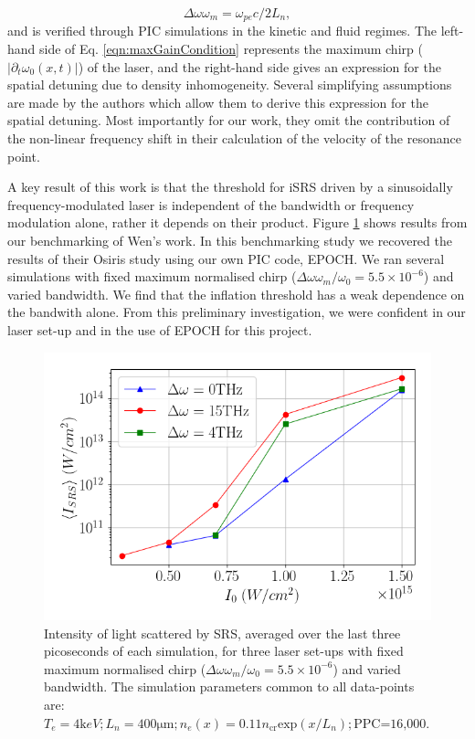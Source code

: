\begin{equation}\label{eqn:maxGainCondition}
 \Delta\omega\omega_m = \omega_{pe}c / 2L_n,
\end{equation} and is verified through PIC simulations in the kinetic and fluid regimes. The left-hand side of Eq. \ref{eqn:maxGainCondition} represents the maximum chirp ($|\partial_t\omega_0(x,t)|$) of the laser, and the right-hand side gives an expression for the spatial detuning due to density inhomogeneity. Several simplifying assumptions are made by the authors which allow them to derive this expression for the spatial detuning. Most importantly for our work, they omit the contribution of the non-linear frequency shift in their calculation of the velocity of the resonance point. 

A key result of this work is that the threshold for iSRS driven by a sinusoidally frequency-modulated laser is independent of the bandwidth or frequency modulation alone, rather it depends on their product. Figure \ref{fig:Wenreplication} shows results from our benchmarking of Wen's work. In this benchmarking study we recovered the results of their Osiris study using our own PIC code, EPOCH. We ran several simulations with fixed maximum normalised chirp ($\Delta\omega \omega_m / \omega_0=5.5\times10^{-6}$) and varied bandwidth. We find that the inflation threshold has a weak dependence on the bandwith alone. From this preliminary investigation, we were confident in our laser set-up and in the use of EPOCH for this project.


\begin{figure}[ht]
   \centering
    \includegraphics[width=0.75\columnwidth]{Chapters/C5_broadband/fig51_thesis.png}
    \caption{Intensity of light scattered by SRS, averaged over the last three picoseconds of each simulation, for three laser set-ups with fixed maximum normalised chirp ($\Delta\omega \omega_m / \omega_0=5.5\times10^{-6}$) and varied bandwidth. The simulation parameters common to all data-points are: $T_e = 4\si{\kilo eV}; L_n = 400\si{\micro\metre}; n_e(x) = 0.11n_{\text{cr}}\text{exp}(x/L_n);\text{PPC=16,000}. $}
    \label{fig:Wenreplication}
\end{figure}{}


